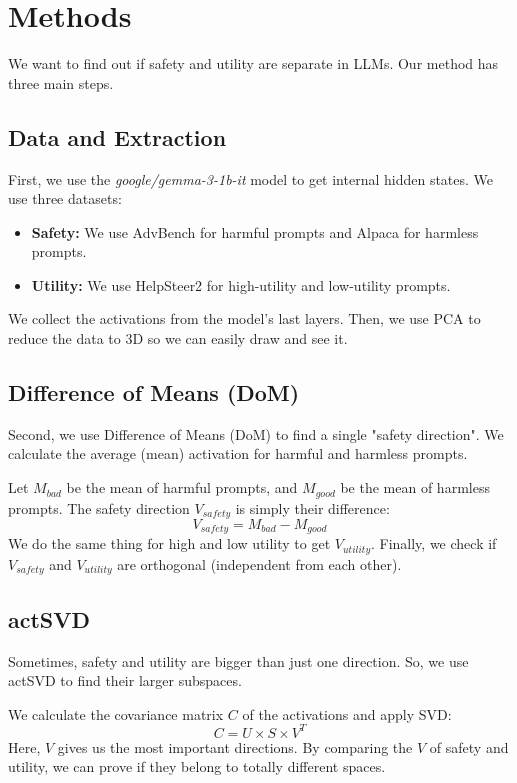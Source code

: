 \section{Methods}
We want to find out if safety and utility are separate in LLMs. Our method has three main steps.

\subsection{Data and Extraction}
First, we use the \textit{google/gemma-3-1b-it} model to get internal hidden states. We use three datasets:
\begin{itemize}
    \item \textbf{Safety:} We use AdvBench for harmful prompts and Alpaca for harmless prompts.
    \item \textbf{Utility:} We use HelpSteer2 for high-utility and low-utility prompts.
\end{itemize}
We collect the activations from the model's last layers. Then, we use PCA to reduce the data to 3D so we can easily draw and see it.

\subsection{Difference of Means (DoM)}
Second, we use Difference of Means (DoM) to find a single "safety direction". We calculate the average (mean) activation for harmful and harmless prompts. 

Let $M_{bad}$ be the mean of harmful prompts, and $M_{good}$ be the mean of harmless prompts. The safety direction $V_{safety}$ is simply their difference:
$$ V_{safety} = M_{bad} - M_{good} $$
We do the same thing for high and low utility to get $V_{utility}$. Finally, we check if $V_{safety}$ and $V_{utility}$ are orthogonal (independent from each other).

\subsection{actSVD}
Sometimes, safety and utility are bigger than just one direction. So, we use actSVD to find their larger subspaces. 

We calculate the covariance matrix $C$ of the activations and apply SVD:
$$ C = U \times S \times V^T $$
Here, $V$ gives us the most important directions. By comparing the $V$ of safety and utility, we can prove if they belong to totally different spaces.